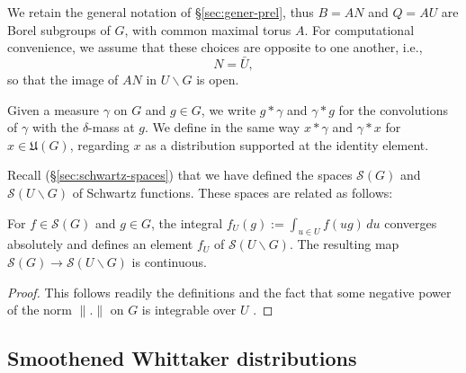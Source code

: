 We retain the general notation of \S\ref{sec:gener-prel}, thus $B = A N$ and $Q = AU$ are Borel subgroups of $G$, with common maximal torus $A$.  For computational convenience, we assume that these choices are opposite to one another, i.e.,
\begin{equation*}
  N = \bar{U},
\end{equation*}
so that the image of $A N$ in $U \backslash G$ is open.

Given a measure $\gamma$ on $G$ and $g \in G$, we write $g \ast \gamma$ and $\gamma \ast g$ for the convolutions of $\gamma$ with the $\delta$-mass at $g$.  We define in the same way $x \ast \gamma$ and $\gamma \ast x$ for $x \in \mathfrak{U}(G)$, regarding $x$ as a distribution supported at the identity element.

Recall (\S\ref{sec:schwartz-spaces}) that we have defined the spaces $\mathcal{S}(G)$ and $\mathcal{S}(U \backslash G)$ of Schwartz functions.  These spaces are related as follows:
\begin{lemma}\label{lem:cal-S-G-to-cal-S-U-G}
  For $f \in \mathcal{S}(G)$ and $g \in G$, the integral $f_U(g) := \int_{u \in U} f(u g) \, d u$ converges absolutely and defines an element $f_U$ of $\mathcal{S}(U \backslash G)$.  The resulting map $\mathcal{S}(G) \rightarrow \mathcal{S}(U \backslash G)$ is continuous.
\end{lemma}
\begin{proof}
  This follows readily the definitions and the fact that some negative power of the norm $\|.\|$ on $G$ is integrable over $U$ \cite[Cor 1.3] {MR1001613}.
\end{proof}

\subsection{Smoothened Whittaker distributions}

